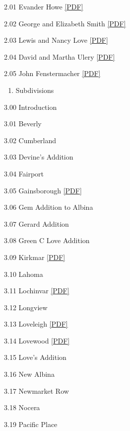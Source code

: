 \documentclass[
  12pt,
]{book}
\providecommand{\tightlist}{%
  \setlength{\itemsep}{0pt}\setlength{\parskip}{0pt}}
\begin{document}
2.01 Evander Howe \href{https://drive.google.com/open?id=1YAycX-_hJXmEAvgMUgpsdMuTcHbiE48o}{{[}PDF{]}}

2.02 George and Elizabeth Smith \href{https://drive.google.com/open?id=1AAWNbZ1PpfN6j8m0dtyi9sBDhvlUTULD}{{[}PDF{]}}

2.03 Lewis and Nancy Love \href{https://drive.google.com/open?id=1Jv2GCT7bdq1UjKnJm2y1qHjyfE3epBMg}{{[}PDF{]}}

2.04 David and Martha Ulery \href{https://drive.google.com/open?id=1T59_j3N5wUB8kfVnfxyKY33XiNLHroEn}{{[}PDF{]}}

2.05 John Fenstermacher \href{https://drive.google.com/open?id=10M9wj9ehPJ7G1Ga6Z3WUreQJwETT1NW3}{{[}PDF{]}}

\begin{enumerate}
\def\labelenumi{\arabic{enumi}.}
\setcounter{enumi}{2}
\tightlist
\item
  Subdivisions
\end{enumerate}

3.00 Introduction

3.01 Beverly

3.02 Cumberland

3.03 Devine's Addition

3.04 Fairport

3.05 Gainsborough \href{https://drive.google.com/open?id=1-yUUA6gAcEnZ6JcIE4JlhUdyhjZH-XkU}{{[}PDF{]}}

3.06 Gem Addition to Albina

3.07 Gerard Addition

3.08 Green C Love Addition

3.09 Kirkmar \href{https://drive.google.com/open?id=1K0Vy_pLA6v6lHOG20JHfW3pFNbB_y_As}{{[}PDF{]}}

3.10 Lahoma

3.11 Lochinvar \href{https://drive.google.com/open?id=1WYFm9L-zLTn4d3Z-P0jHR7H764vB_IzJ}{{[}PDF{]}}

3.12 Longview

3.13 Loveleigh \href{https://drive.google.com/open?id=124KTO88KNKYI06S_Kg7mD37j-HojvKZM}{{[}PDF{]}}

3.14 Lovewood \href{https://drive.google.com/open?id=1MFAF_zvS91iEljKEif22ZFuFzNk1NBpg}{{[}PDF{]}}

3.15 Love's Addition

3.16 New Albina

3.17 Newmarket Row

3.18 Nocera

3.19 Pacific Place
\end{document}
